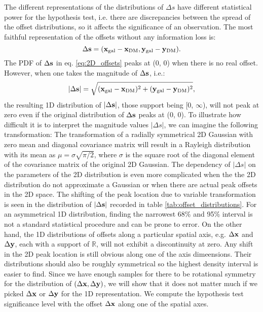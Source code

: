 The different representations of the distributions of $\Delta s$ have different 
statistical power for the hypothesis test, i.e. there are discrepancies between
the spread of the offset distributions, so
it affects the significance of an observation. 
The most faithful representation of the offsets without any information loss
is:
\begin{equation}
	\Delta {\bf s} = ({\bf x}_{\rm gal} - {\bf x}_{\rm DM}, 
	{\bf y}_{\rm gal} - {\bf y}_{\rm DM} ).
	\label{eq:2D_offsets}
\end{equation}
The PDF of $\Delta {\bf s}$ in eq. \ref{eq:2D_offsets} peaks at (0, 0) when there is no real offset.
However, when one takes the magnitude of $\Delta {\bf s}$, i.e.:
\begin{equation}
	|\Delta {\bf s}| = \sqrt{({\bf x}_{\rm gal} - {\bf x}_{\rm DM})^2 + 
	({\bf y}_{\rm gal} - {\bf y}_{\rm DM})^2},
	\label{eq:magnitude_offsets}
\end{equation}
the resulting 1D distribution of $|\Delta {\bf s}|$, 
those support being [0, $\infty$),
will not peak at zero even if the original
distribution of $\Delta {\bf s}$ peaks at (0, 0). 
To illustrate how difficult it is to interpret the magnitude values $|\Delta
s|$,  
we can imagine the following transformation:
The transformation of a radially symmetrical 
2D Gaussian with zero mean and diagonal covariance matrix will result
in a Rayleigh distribution with its mean as $\mu = \sigma \sqrt{\pi / 2}$, where
$\sigma$ is the square root of the diagonal element of the covariance matrix 
of the original 2D Gaussian. The dependency of $|\Delta s|$ on the parameters of
the 2D distribution is even more
complicated when the the 2D distribution do not approximate a Gaussian 
or when there are actual peak offsets in the 2D space. 
The shifting of the peak location due to variable transformation 
is seen in the distribution of $|\Delta {\bf s}|$ recorded in table
\ref{tab:offset_distributions}.
For an asymmetrical 1D distribution, finding the narrowest 68\% and 95\% interval
is not a standard statistical procedure and can be prone to error.
On the other hand, 
the 1D distributions of offsets along a particular spatial axis, 
e.g. $\Delta {\bf x}$ and $\Delta {\bf y}$,
each with a support of $\mathbb{R}$, will not exhibit a discontinuity at zero.
Any shift in the 2D peak location is still obvious along one of the axis
dimeensions. 
Their distributions should also be roughly symmetrical so 
the highest density interval is easier to find.
Since we have enough samples for there to be
rotational symmetry for the distribution of $(\Delta {\bf x}, \Delta {\bf y})$,
we will show that it does not
matter much if we picked $\Delta {\bf x}$ or $\Delta {\bf y}$ for the 1D representation.
We compute the hypothesis test significance level with the 
 offset $\Delta {\bf x}$ along one of the spatial axes. 

